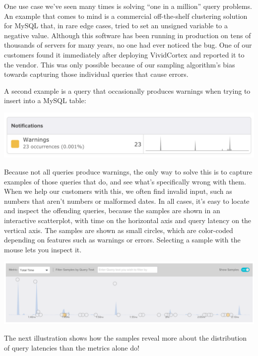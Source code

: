 \documentclass{vivid_layout}
\begin{document}
One use case we've seen many times is solving ``one in a million'' query
problems. An example that comes to mind is a commercial off-the-shelf clustering
solution for MySQL that, in rare edge cases, tried to set an unsigned variable
to a negative value.  Although this software has been running in production on
tens of thousands of servers for many years, no one had ever noticed the bug.
One of our customers found it immediately after deploying VividCortex and
reported it to the vendor. This was only possible because of our sampling
algorithm's bias towards capturing those individual queries that cause errors.

A second example is a query that occasionally produces warnings when trying to
insert into a MySQL table:

\begin{center}
\includegraphics[width=.85\linewidth]{sketch-sampling/million}
\end{center}

Because not all queries produce warnings, the only way to solve this is to
capture examples of those queries that do, and see what's specifically wrong with
them. When we help our customers with this, we often find invalid input, such as
numbers that aren't numbers or malformed dates. In all cases, it's easy to
locate and inspect the offending queries, because the samples are shown in an
interactive scatterplot, with time on the horizontal axis and query latency on
the vertical axis. The samples are shown as small circles, which are color-coded
depending on features such as warnings or errors. Selecting a sample with the
mouse lets you inspect it.

\begin{center}
\includegraphics[width=.85\linewidth]{sketch-sampling/warnings}
\end{center}

The next illustration shows how the samples reveal more about the distribution
of query latencies than the metrics alone do!
\end{document}
